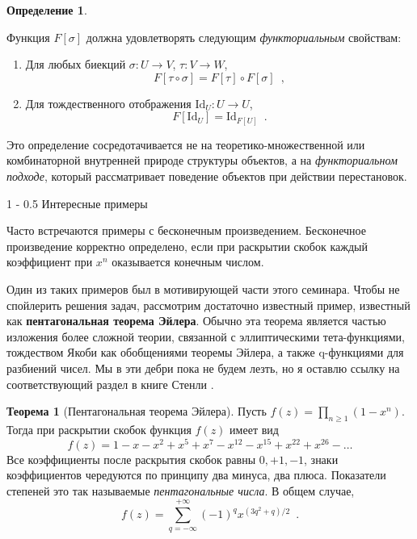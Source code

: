 \documentclass{article}
\makeatletter
\theoremstyle{definition}
\newtheorem*{theorem}{Теорема}
\newtheorem*{definition}{Определение}
\renewcommand{\section}{\@startsection
{section}%
{1}%
{\z@}%
{-\baselineskip}%
{0.5\baselineskip}%
{\centering\large\scshape}} %
\makeatother
\begin{document}
\begin{enumerate}
\begin{definition}
\begin{enumerate}
		 	Функция \( F[\sigma] \) должна удовлетворять следующим 
		 	\textit{функториальным} свойствам:
		 	\begin{enumerate}
			 	\item Для любых биекций \( \sigma \colon U \to V \), \( \tau 
			 	\colon V \to W \),
			 	\[
			 		F[\tau \circ \sigma] = F[\tau] \circ F[\sigma] \enspace ,
			 	\]
			 	\item Для тождественного отображения \( \mathrm{Id}_{U} \colon 
			 	U \to U 
			 	\),
			 	\[
			 		F[\mathrm{Id}_{U}] = \mathrm{Id}_{F[U]} \enspace .
			 	\]
		 	\end{enumerate}
	 	\end{enumerate}
	\end{definition}
	Это определение сосредотачивается не на теоретико-множественной или 
	комбинаторной внутренней природе структуры объектов, а на 
	\textit{функториальном подходе}, который рассматривает поведение объектов 
	при действии перестановок.
\end{enumerate}

\section{Интересные примеры}

Часто встречаются примеры с бесконечным произведением. Бесконечное произведение 
корректно определено, если при раскрытии скобок каждый коэффициент при \( x^n 
\) оказывается конечным числом.

Один из таких примеров был в мотивирующей части этого семинара. Чтобы не 
спойлерить решения задач, рассмотрим достаточно известный пример, известный как 
\textbf{пентагональная 
теорема Эйлера}. Обычно эта теорема является частью изложения более сложной 
теории, связанной с эллиптическими тета-функциями, тождеством Якоби как 
обобщениями теоремы Эйлера, а также q-функциями для разбиений чисел. Мы в эти 
дебри пока не будем лезть, но я оставлю ссылку на соответствующий раздел в 
книге Стенли \cite[Section 1.8]{stanley1}.

\begin{theorem}[Пентагональная теорема Эйлера]
	Пусть \( f(z) = \prod_{n \geq 1}(1 - x^n) \). Тогда при раскрытии скобок 
	функция \( f(z) \) имеет вид
	\[
		f(z) = 1 - x - x^2 + x^5 + x^7 - x^{12} - x^{15} + x^{22} + x^{26} - 
		\ldots
	\]
	Все коэффициенты после раскрытия скобок равны \( 0, +1, -1 \), знаки 
	коэффициентов чередуются по принципу два минуса, два плюса. Показатели 
	степеней это так называемые \textit{пентагональные числа}. В общем случае,
	\[
		f(z) = \sum_{q = -\infty}^{+\infty} (-1)^{q} x^{(3q^2+q)/2} \enspace .
	\]
\end{theorem}
\end{document}
